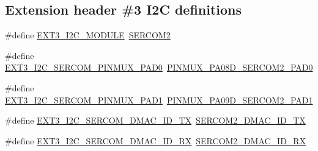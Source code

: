 \subsection*{Extension header \#3 I2C definitions}
\begin{DoxyCompactItemize}
\item 
\#define \mbox{\hyperlink{group__samd21__xplained__pro__features__group_ga2f282089eefa035e3a0c1adf3b7fed43}{E\+X\+T3\+\_\+\+I2\+C\+\_\+\+M\+O\+D\+U\+LE}}~\mbox{\hyperlink{group___s_a_m_d21_j18_a__base_ga918e4c85993961a115bb23b4bb73a87f}{S\+E\+R\+C\+O\+M2}}
\item 
\#define \mbox{\hyperlink{group__samd21__xplained__pro__features__group_ga197dff44b37ec441073abbccc50149c4}{E\+X\+T3\+\_\+\+I2\+C\+\_\+\+S\+E\+R\+C\+O\+M\+\_\+\+P\+I\+N\+M\+U\+X\+\_\+\+P\+A\+D0}}~\mbox{\hyperlink{pio_2samd21j18a_8h_abe10d951128e796cb99f36d5c5489dda}{P\+I\+N\+M\+U\+X\+\_\+\+P\+A08\+D\+\_\+\+S\+E\+R\+C\+O\+M2\+\_\+\+P\+A\+D0}}
\item 
\#define \mbox{\hyperlink{group__samd21__xplained__pro__features__group_ga38d55a0120c9521f025a60b2fa34b2ad}{E\+X\+T3\+\_\+\+I2\+C\+\_\+\+S\+E\+R\+C\+O\+M\+\_\+\+P\+I\+N\+M\+U\+X\+\_\+\+P\+A\+D1}}~\mbox{\hyperlink{pio_2samd21j18a_8h_adbd76732457e667e3b04123a950bcfc1}{P\+I\+N\+M\+U\+X\+\_\+\+P\+A09\+D\+\_\+\+S\+E\+R\+C\+O\+M2\+\_\+\+P\+A\+D1}}
\item 
\#define \mbox{\hyperlink{group__samd21__xplained__pro__features__group_ga6ed2ba04435c4c3b78e869e985f6fc5e}{E\+X\+T3\+\_\+\+I2\+C\+\_\+\+S\+E\+R\+C\+O\+M\+\_\+\+D\+M\+A\+C\+\_\+\+I\+D\+\_\+\+TX}}~\mbox{\hyperlink{sercom2_8h_a18e80edc1d1852734d9542e87c7cc485}{S\+E\+R\+C\+O\+M2\+\_\+\+D\+M\+A\+C\+\_\+\+I\+D\+\_\+\+TX}}
\item 
\#define \mbox{\hyperlink{group__samd21__xplained__pro__features__group_gaba7bf394d683a2a1cce88c6160c661b7}{E\+X\+T3\+\_\+\+I2\+C\+\_\+\+S\+E\+R\+C\+O\+M\+\_\+\+D\+M\+A\+C\+\_\+\+I\+D\+\_\+\+RX}}~\mbox{\hyperlink{sercom2_8h_adbdd3a084fc9f85a052c316d917e46ac}{S\+E\+R\+C\+O\+M2\+\_\+\+D\+M\+A\+C\+\_\+\+I\+D\+\_\+\+RX}}
\end{DoxyCompactItemize}
